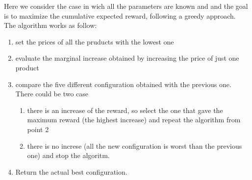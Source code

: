 Here we consider the case in wich all the parameters are known and and the goal is to maximize the cumulative expected reward, following a greedy approach.\\
The algorithm works as follow:
\begin{enumerate}
    \item set the prices of all the pruducts with the lowest one
    \item evaluate the marginal increase obtained by increasing the price of just one product
    \item compare the five different configuration obtained with the previous one. There could be two case\begin{enumerate}
        \item there is an increase of the reward, so select the one that gave the maximum reward (the highest increase) and repeat the algorithm from point 2
        \item there is no increse (all the new configuration is worst than the previous one) and stop the algoritm. 
    \end{enumerate}
    \item Return the actual best configuration.
\end{enumerate}
